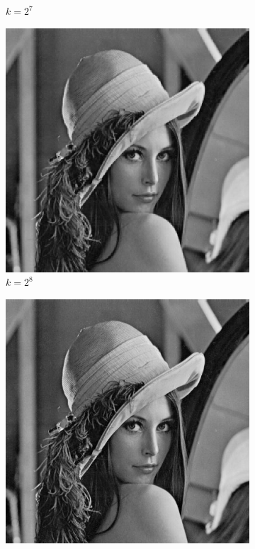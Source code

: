 \begin{figure}[H]
\begin{subfigure}[b]{0.3\textwidth}
        \caption{$k = 2^7$}
    \end{subfigure}
    \hfill
    \begin{subfigure}[b]{0.3\textwidth}
        \centering
        \includegraphics[width=\textwidth]{problem1/image_lena_24bit_256.bmp}
        \caption{$k = 2^8$}
    \end{subfigure}
    \begin{subfigure}[b]{0.3\textwidth}
        \centering
        \includegraphics[width=\textwidth]{problem1/image_lena_24bit_512.bmp}

\end{subfigure}
\end{figure}
